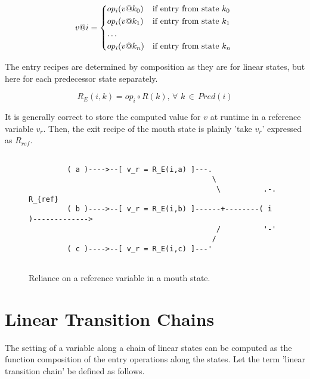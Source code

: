\documentclass[12pt,a4paper]{scrartcl}
\begin{document}
\begin{equation} \label{eq:interference}
    v@i = \begin{dcases*}
            op_i(v@k_0) & if entry from state $k_0$ \\
            op_i(v@k_1) & if entry from state $k_1$ \\
            \ldots \\
            op_i(v@k_n) & if entry from state $k_n$ \\
        \end{dcases*}
\end{equation}

The entry recipes are determined by composition as they are for linear
states, but here for each predecessor state separately.

\begin{equation} \label{eq:mouth-composition}
    R_E(i,k) = op_i \circ R(k),\,\forall\,\,k\,\in\,Pred(i)
\end{equation}

It is generally correct to store the computed value for $v$ at runtime in a
reference variable $v_r$. Then,  the exit recipe of the mouth state is plainly
'take $v_r$' expressed as $R_{ref}$.

\begin{figure}[htbp] \leavevmode \label{fig:mouth-state}
    \begin{verbatim}

         ( a )---->--[ v_r = R_E(i,a) ]---.
                                           \ 
                                            \          .-.    R_{ref}
         ( b )---->--[ v_r = R_E(i,b) ]------+--------( i )-------------> 
                                            /          '-'
                                           /
         ( c )---->--[ v_r = R_E(i,c) ]---'
             

    \end{verbatim}
    \caption{Reliance on a reference variable in a mouth state.}
\end{figure}

\section{Linear Transition Chains}

The setting of a variable along a chain of linear states can be computed as the
function composition of the entry operations along the states. Let the term 'linear
transition chain' be defined as follows. 
\end{document}
